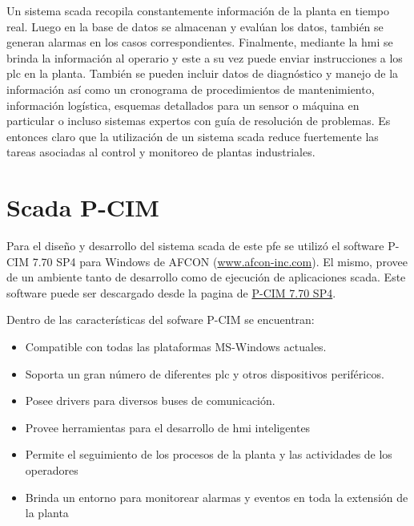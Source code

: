 Un sistema \gls{scada} recopila constantemente información de la planta en tiempo real. Luego en 
la base de datos se almacenan y evalúan los datos, también se generan alarmas en los casos 
correspondientes. Finalmente, mediante la \gls{hmi} se brinda la información al operario y 
este a su vez puede enviar instrucciones a los \gls{plc} en la planta. 
También se pueden incluir datos de diagnóstico y manejo de la información así como un cronograma 
de procedimientos de mantenimiento, información logística, esquemas detallados para un sensor 
o máquina en particular o incluso sistemas expertos con guía de resolución de problemas. Es 
entonces claro que la utilización de un sistema \gls{scada} reduce fuertemente las tareas asociadas al control
y monitoreo de plantas industriales.
 

\section{Scada P-CIM}
\label{sec:ScadaPCIM} 
Para el diseño y desarrollo del sistema \gls{scada} de este \gls{pfe} se utilizó el software 
P-CIM 7.70 SP4 para Windows de AFCON (\url{www.afcon-inc.com}). El mismo, provee de un ambiente 
tanto de desarrollo como de ejecución de aplicaciones \gls{scada}. Este software puede ser 
descargado desde la pagina de 
\href{http://www.afcon-inc.com/Templates/showpage.asp?TMID=108&FID=733&PID=0&IID=8334}{P-CIM 7.70 SP4}.

Dentro de las características del sofware P-CIM se encuentran:
\begin{itemize}
 \item Compatible con todas las plataformas MS-Windows actuales.
 \item Soporta un gran número de diferentes \gls{plc} y otros dispositivos periféricos.
 \item Posee drivers para diversos buses de comunicación.
 \item Provee herramientas para el desarrollo de \gls{hmi} inteligentes 
 \item Permite el seguimiento de los procesos de la planta y las actividades de los operadores
 \item Brinda un entorno para monitorear alarmas y eventos en toda la extensión de la planta
\end{itemize}


